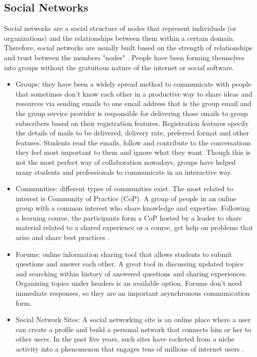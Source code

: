 \documentclass[12pt,a4paper,final,twoside,onecolumn,titlepage]{book}
\begin{document}
\subsection{Social Networks}
Social networks are a social structure of nodes that represent individuals (or organizations) and the relationships between them within a certain domain. Therefore, social networks are usually built based on the strength of relationships and trust between the members "nodes" \cite{W22}. People have been forming themselves into groups without the gratuitous nature of the internet or social software.
\begin{itemize}
\item Groups: they have been a widely spread method to communicate with people that sometimes don’t know each other in a productive way to share ideas and resources via sending emails to one email address that is the group email and the group service provider is responsible for delivering those emails to group subscribers based on their registration features. Registration features specify the details of mails to be delivered, delivery rate, preferred format and other features. Students read the emails, follow and contribute to the conversations they feel most important to them and ignore what they want. Though this is not the most perfect way of collaboration nowadays, groups have helped many students and professionals to communicate in an interactive way.
\item Communities: different types of communities exist. The most related to interest is Community of Practice (CoP). A group of people in an online group with a common interest who share knowledge and expertise. Following a learning course, the participants form a CoP hosted by a leader to share material related to a shared experience or a course, get help on problems that arise and share best practices \cite{W23}.
\item Forums: online information sharing tool that allows students to submit questions and answer each other. A great tool in discussing updated topics and searching within history of answered questions and sharing experiences. Organizing topics under headers is an available option. Forums don’t need immediate responses, so they are an important asynchronous communication form.
\item Social Network Sites: A social networking site is an online place where a user can create a profile and build a personal network that connects him or her to other users. In the past five years, such sites have rocketed from a niche activity into a phenomenon that engages tens of millions of internet users \cite{W24}.
\end{itemize}
\end{document}
